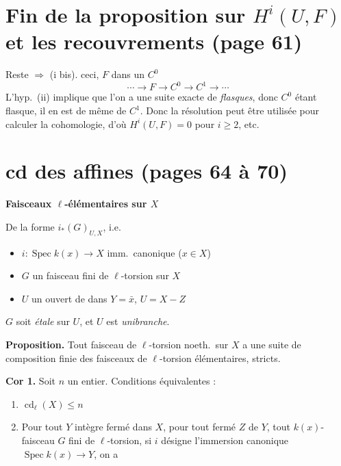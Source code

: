 \documentclass[11pt,a4paper]{article}
\begin{document}
\section*{Fin de la proposition sur $H^{i}(U,F)$ et les recouvrements (page 61)}


Reste \struck{\ill{}}  $\Rightarrow$ (i bis). \ill{} ceci,
\ill{} \ill{} $F$ dans un  \ill{} $C^{0}$ \ill{}
\[
\cdots \longrightarrow F \longrightarrow C^{0} \longrightarrow C^{1}
\longrightarrow \cdots
\]
L'hyp.\ (ii) implique que l'on a une suite exacte de \emph{flasques}, donc
$C^{0}$ étant flasque, il en est de même de $C^{1}$. Donc la résolution peut
être utilisée pour calculer la cohomologie, d'où $H^{i}(U,F) = 0$ pour
$i \geqslant 2$, etc.

\section*{cd des affines (pages 64 à 70)}

\textbf{Faisceaux $\ell$-élémentaires sur $X$} \quad [$X$ noeth.]

De la forme $i_{*}(G)_{U,X}$, i.e.
\begin{itemize}
\item $i : \operatorname{Spec} k(x) \longrightarrow X$ imm.\ canonique
  ($x \in X$)
\item $G$ un faisceau fini de $\ell$-torsion sur $X$
\item $U$ un  ouvert de  dans
  $Y = \bar{x}$, \quad $U = X - Z$
\end{itemize}

  $G$ soit \emph{étale}
sur $U$, et $U$ est \emph{unibranche}.

\textbf{Proposition.} Tout faisceau de $\ell$-torsion noeth.\ sur $X$ a une
suite de composition finie des faisceaux de $\ell$-torsion élémentaires,
stricts.

\textbf{Cor 1.} Soit $n$ un entier. Conditions équivalentes :
\begin{enumerate}
\item[(i)] $\operatorname{cd}_{\ell}(X) \leqslant n$
\item[(ii)] Pour tout $Y$ intègre fermé dans $X$, 
   pour tout fermé $Z$ de $Y$,  tout
  $k(x)$-faisceau $G$ fini de $\ell$-torsion, si $i$ désigne l'immersion
  canonique $\operatorname{Spec} k(x) \to Y$, on a
\end{enumerate}
\end{document}
